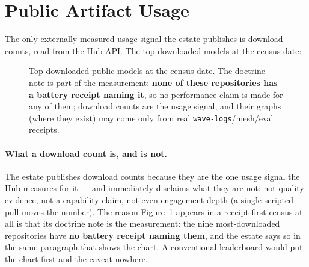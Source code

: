 \section{Public Artifact Usage}
\label{sec:usage}

The only externally measured usage signal the estate publishes is download counts, read from the Hub API. The top-downloaded models at the census date:

\begin{figure}[htbp]
\centering
{}
\caption{Top-downloaded public models at the census date. The doctrine note is part of the measurement: \textbf{none of these repositories has a battery receipt naming it}, so no performance claim is made for any of them; download counts are the usage signal, and their graphs (where they exist) may come only from real \texttt{wave-logs}/mesh/eval receipts.}
\label{fig:downloads}
\end{figure}

\paragraph{What a download count is, and is not.} The estate publishes download counts because they are the one usage signal the Hub measures for it --- and immediately disclaims what they are not: not quality evidence, not a capability claim, not even engagement depth (a single scripted pull moves the number). The reason Figure~\ref{fig:downloads} appears in a receipt-first census at all is that its doctrine note is the measurement: the nine most-downloaded repositories have \textbf{no battery receipt naming them}, and the estate says so in the same paragraph that shows the chart. A conventional leaderboard would put the chart first and the caveat nowhere.

